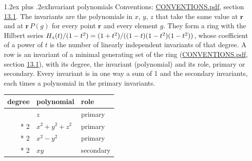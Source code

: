\documentclass[10pt,a4paper]{article}
\makeatletter
\renewcommand\section{\@startsection{section}{1}{\z@}{-3ex plus -1ex minus -.2ex}%
  {1.2ex plus .2ex}{\normalfont\large\sffamily\bfseries\color{parttitle}}}
\numberwithin{equation}{section}
\newcommand{\irr}[1]{\text{\normalfont\scshape #1}}
\newcommand{\pointr}{\mathbf{r}}
\makeatother
\begin{document}
\section{Invariant polynomials}\label{s:invariant_polynomials}
Conventions: \href{../../CONVENTIONS.pdf}{CONVENTIONS.pdf}, section \href{../../CONVENTIONS.pdf\#conv.13.1}{13.1}.
The invariants are the polynomials in $x$, $y$, $z$ that take the same value at $\pointr$ and at $\pointr\,P(g)$ for every point $\pointr$ and every element $g$. They form a ring with the Hilbert series $H_{\irr{a}}(t)/(1-t^{2}) = (1 + t^{2})/((1-t)(1-t^{2})(1-t^{2}))$, whose coefficient of a power of $t$ is the number of linearly independent invariants of that degree. \label{n:head.degree}\label{n:head.role}A row is an invariant of a minimal generating set of the ring (\href{../../CONVENTIONS.pdf}{CONVENTIONS.pdf}, section \href{../../CONVENTIONS.pdf\#conv.13.1}{13.1}), with its degree, the invariant (polynomial) and its role, primary or secondary. Every invariant is in one way a sum of 1 and the secondary invariants, each times a polynomial in the primary invariants.
{\small\begin{longtable}{@{}rll@{}}\toprule
degree & polynomial & role\\\midrule\endhead
\bottomrule\endfoot\endlastfoot
1 & $z$ & primary\\*
2 & $x^{2} + y^{2} + z^{2}$ & primary\\*
2 & $x^{2} - y^{2}$ & primary\\*
2 & $xy$ & secondary\\
\bottomrule\end{longtable}}
\end{document}
